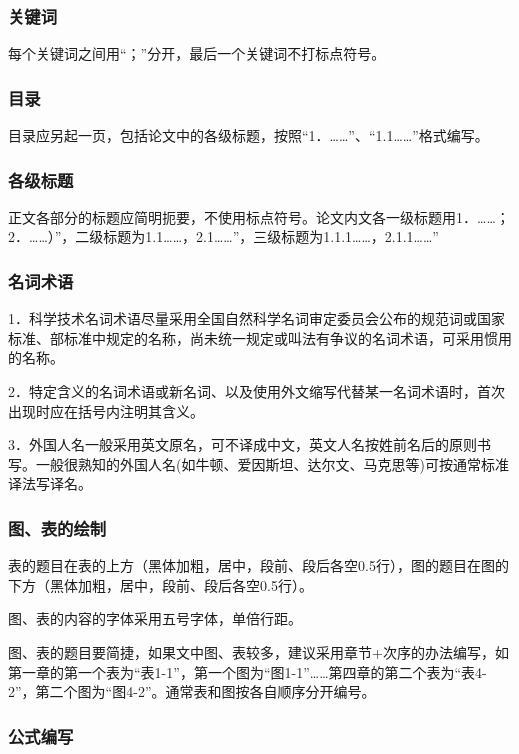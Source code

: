 \subsubsection{关键词}

每个关键词之间用“；”分开，最后一个关键词不打标点符号。

\subsubsection{目录}

目录应另起一页，包括论文中的各级标题，按照“1．……”、“1.1……”格式编写。

\subsubsection{各级标题}

正文各部分的标题应简明扼要，不使用标点符号。论文内文各一级标题用1．……；2．……）”，二级标题为1.1……，2.1……”，三级标题为1.1.1……，2.1.1……”

\subsubsection{名词术语}

1．科学技术名词术语尽量采用全国自然科学名词审定委员会公布的规范词或国家标准、部标准中规定的名称，尚未统一规定或叫法有争议的名词术语，可采用惯用的名称。

2．特定含义的名词术语或新名词、以及使用外文缩写代替某一名词术语时，首次出现时应在括号内注明其含义。

3．外国人名一般采用英文原名，可不译成中文，英文人名按姓前名后的原则书写。一般很熟知的外国人名(如牛顿、爱因斯坦、达尔文、马克思等)可按通常标准译法写译名。

\subsubsection{图、表的绘制}

表的题目在表的上方（黑体加粗，居中，段前、段后各空0.5行），图的题目在图的下方（黑体加粗，居中，段前、段后各空0.5行）。

图、表的内容的字体采用五号字体，单倍行距。

图、表的题目要简捷，如果文中图、表较多，建议采用章节+次序的办法编写，如第一章的第一个表为“表1-1”，第一个图为“图1-1”……第四章的第二个表为“表4-2”，第二个图为“图4-2”。通常表和图按各自顺序分开编号。

\subsubsection{公式编写}

